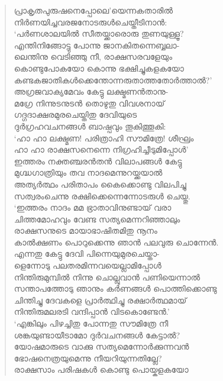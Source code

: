 \begin{verse}
പ്രാകൃതപുരുഷനെപ്പോലെ’യെന്നകതാരില്‍\\
നിര്‍ണയിച്ചവരജനോടരുള്‍ചെയ്തീടിനാന്‍:\\
‘പര്‍ണശാലയില്‍ സീതയ്ക്കാരൊരു തുണയുള്ളൂ?\\
എന്തിനിങ്ങോട്ടു പോന്നു ജാനകിതന്നെബ്ബലാ-\\
ലെന്തിനു വെടിഞ്ഞു നീ, രാക്ഷസരവളേയും\\
കൊണ്ടുപോകയോ കൊന്നു ഭക്ഷിച്ചുകളകയോ\\
കണ്ടകജാതികള്‍ക്കെന്തോന്നരുതാത്തതോര്‍ത്താല്‍?’\\
അഗ്രജവാക്യമേവം കേട്ടു ലക്ഷ്മണന്‍താനു-\\
മഗ്രേ നിന്നുടനുടന്‍ തൊഴുതു വിവശനായ്\\
ഗദ്ഗദാക്ഷരമുരചെയ്തിതു ദേവിയുടെ\\
ദുര്‍ഗ്രഹവചനങ്ങള്‍ ബാഷ്പവും തൂകിത്തൂകി:\\
‘ഹാ ഹാ ലക്ഷ്മണ! പരിത്രാഹി സൗമിത്രേ! ശീഘ്രം\\
ഹാ ഹാ രാക്ഷസനെന്നെ നിഗ്രഹിച്ചീടുമിപ്പോള്‍’\\
ഇത്തരം നക്തഞ്ചരന്‍തന്‍ വിലാപങ്ങള്‍ കേട്ടു\\
മുഗ്ദ്ധഗാത്രിയും തവ നാദമെന്നുറയ്ക്കയാല്‍\\
അത്യര്‍ത്ഥം പരിതാപം കൈക്കൊണ്ടു വിലപിച്ചു\\
സത്വരംചെന്നു രക്ഷിക്കെന്നെന്നോടരുള്‍ ചെയ്തു.\\
‘ഇത്തരം നാദം മമ ഭ്രാതാവിനുണ്ടായ് വരാ\\
ചിത്തമോഹവും വേണ്ട സത്യമെന്നറിഞ്ഞാലും\\
രാക്ഷസനുടെ മായാഭാഷിതമിതു നൂനം\\
കാല്‍ക്ഷണം പൊറുക്കെന്നു ഞാന്‍ പലവുരു \hbox{ചൊന്നേന്‍.}\\
എന്നതു കേട്ടു ദേവി പിന്നെയുമുരചെയ്താ-\\
ളെന്നോടു പലതരമിന്നവയെല്ലാമിപ്പോള്‍\\
നിന്തിരുമുമ്പില്‍ നിന്നു ചൊല്ലുവാന്‍ പണിയെന്നാല്‍\\
സന്താപത്തോടു ഞാനും കര്‍ണങ്ങള്‍ \hbox{പൊത്തിക്കൊണ്ടു}\\
ചിന്തിച്ചു ദേവകളെ പ്രാര്‍ത്ഥിച്ചു രക്ഷാര്‍ത്ഥമായ്\\
നിന്തിരുമലരടി വന്ദിപ്പാന്‍ വിടകൊണ്ടേന്‍.’\\
‘എങ്കിലും പിഴച്ചിതു പോന്നതു സൗമിത്രേ നീ\\
ശങ്കയുണ്ടായീടാമോ ദുര്‍വചനങ്ങള്‍ കേട്ടാല്‍?\\
യോഷമാരുടെ വാക്കു സത്യമെന്നോര്‍ക്കുന്നവന്‍\\
ഭോഷനെത്രയുമെന്നു നീയറിയുന്നതില്ലേ?\\
രാക്ഷസാം പരിഷകള്‍ കൊണ്ടു പൊയ്കളകയോ\\

\end{verse}
